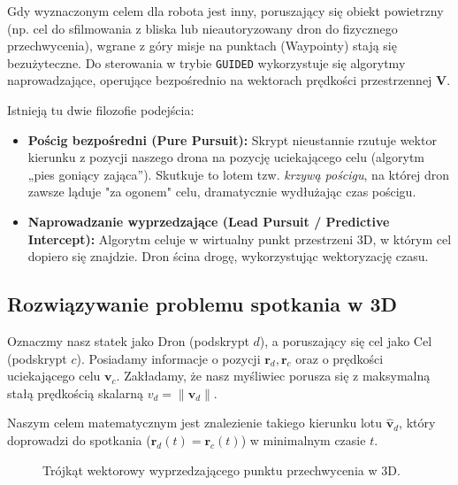 Gdy wyznaczonym celem dla robota jest inny, poruszający się obiekt powietrzny (np. cel do sfilmowania z bliska lub nieautoryzowany dron do fizycznego przechwycenia), wgrane z góry misje na punktach (Waypointy) stają się bezużyteczne. Do sterowania w trybie \texttt{GUIDED} wykorzystuje się algorytmy naprowadzające, operujące bezpośrednio na wektorach prędkości przestrzennej $\mathbf{V}$.

Istnieją tu dwie filozofie podejścia:
\begin{itemize}
    \item \textbf{Pościg bezpośredni (Pure Pursuit):} Skrypt nieustannie rzutuje wektor kierunku z pozycji naszego drona na pozycję uciekającego celu (algorytm „pies goniący zająca”). Skutkuje to lotem tzw. \textit{krzywą pościgu}, na której dron zawsze ląduje "za ogonem" celu, dramatycznie wydłużając czas pościgu.
    \item \textbf{Naprowadzanie wyprzedzające (Lead Pursuit / Predictive Intercept):} Algorytm celuje w wirtualny punkt przestrzeni 3D, w którym cel dopiero się znajdzie. Dron ścina drogę, wykorzystując wektoryzację czasu.
\end{itemize}

\subsection{Rozwiązywanie problemu spotkania w 3D}

Oznaczmy nasz statek jako Dron (podskrypt $d$), a poruszający się cel jako Cel (podskrypt $c$).
Posiadamy informacje o pozycji $\mathbf{r}_d, \mathbf{r}_c$ oraz o prędkości uciekającego celu $\mathbf{v}_c$. Zakładamy, że nasz myśliwiec porusza się z maksymalną stałą prędkością skalarną $v_d = \|\mathbf{v}_d\|$. 

Naszym celem matematycznym jest znalezienie takiego kierunku lotu $\mathbf{\hat{v}}_d$, który doprowadzi do spotkania ($\mathbf{r}_d(t) = \mathbf{r}_c(t)$) w minimalnym czasie $t$.

\begin{figure}[ht]
    \centering
    \caption{Trójkąt wektorowy wyprzedzającego punktu przechwycenia w 3D.}
    \label{fig:intercept}
\end{figure}

